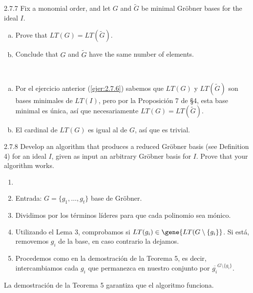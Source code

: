 \documentclass[twoside]{article}
\begin{document}
\begin{ejercicio}{2.7.7}
Fix a monomial order, and let $G$ and $\tilde{G}$ be minimal Gröbner bases for the ideal $I$.
\begin{enumerate}[a.]
\item Prove that $LT (G) = LT (\tilde{G})$.
\item Conclude that $G$ and $\tilde{G}$ have the same number of elements.
\end{enumerate}
\end{ejercicio}
\begin{solucion}\
\begin{enumerate}[a.]
\item Por el ejercicio anterior (\ref{ejer:2.7.6}) sabemos que $LT(G)$ y $LT(\tilde{G})$ son bases minimales de $LT(I)$, pero por la Proposición 7 de §4, esta base minimal es única, así que necesariamente $LT (G) = LT (\tilde{G})$.
\item El cardinal de $LT(G)$ es igual al de $G$, así que es trivial. 
\end{enumerate}
\end{solucion}

\newpage

\begin{ejercicio}{2.7.8}
Develop an algorithm that produces a reduced Gröbner basis (see Definition 4) for an
ideal $I$, given as input an arbitrary Gröbner basis for $I$. Prove that your algorithm works.
\end{ejercicio}
\begin{solucion}
\begin{enumerate}
\item[]
\item Entrada: $G=\{g_1,\dotsc,g_t\}$ base de Gröbner.
\item Dividimos por los términos líderes para que cada polinomio sea mónico. 
\item Utilizando el Lema 3, comprobamos si $LT(g_i)\in \gene{LT(G\setminus\{g_i\}}$. Si está, removemos $g_i$ de la base, en caso contrario la dejamos.
\item Procedemos como en la demostración de la Teorema 5, es decir, intercambiamos cada $g_i$ que permanezca en nuestro conjunto por $\overline{g_i}^{G\setminus \{g_i\}}$.
\end{enumerate}
La demostración de la Teorema 5 garantiza que el algoritmo funciona.
\end{solucion}

\newpage
\end{document}
